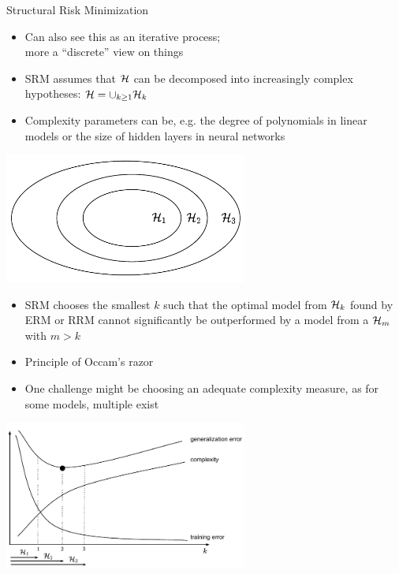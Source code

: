 \documentclass[11pt,compress,t,notes=noshow, xcolor=table]{beamer}
\begin{document}
\begin{vbframe} {Structural Risk Minimization}

\begin{itemize}
  \item Can also see this as an iterative process;\\
  more a ``discrete'' view on things
  \item SRM assumes that $\mathcal{H}$ can be decomposed into increasingly complex hypotheses: 
  $\mathcal{H} = \cup_{k \geq 1 }\mathcal{H}_{k}$
  \item Complexity parameters can be, e.g. the degree of polynomials in linear models or the size of hidden layers in neural networks
\end{itemize}

\lz

\begin{center}
\includegraphics[width=0.6\textwidth]{figure_man/fig-regu-srm-1}
\end{center}

\framebreak


\begin{itemize}

    \item SRM chooses the smallest $k$ such that the optimal model from $\mathcal{H}_k$ found by ERM or RRM cannot significantly
        be outperformed by a model from a $\mathcal{H}_m$ with $m > k$
  \item Principle of Occam's razor
  \item One challenge might be choosing an adequate complexity measure, as for some models, multiple exist
\end{itemize}

\begin{center}
\includegraphics[width=0.6\textwidth]{figure_man/fig-regu-srm-2}
\end{center}


\end{vbframe}
\end{document}

